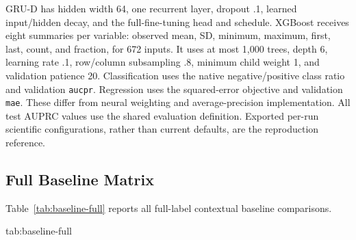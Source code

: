 GRU-D has hidden width 64, one recurrent layer, dropout .1, learned input/hidden decay, and the full-fine-tuning head and schedule. XGBoost receives eight summaries per variable: observed mean, SD, minimum, maximum, first, last, count, and fraction, for 672 inputs. It uses at most 1,000 trees, depth 6, learning rate .1, row/column subsampling .8, minimum child weight 1, and validation patience 20. Classification uses the native negative/positive class ratio and validation \texttt{aucpr}. Regression uses the squared-error objective and validation \texttt{mae}. These differ from neural weighting and average-precision implementation. All test AUPRC values use the shared evaluation definition. Exported per-run scientific configurations, rather than current defaults, are the reproduction reference.

\subsection{Full Baseline Matrix}

Table~\ref{tab:baseline-full} reports all full-label contextual baseline comparisons.

\begin{table}[htbp]
\floatconts
  {tab:baseline-full}
  {\caption{Full-data contextual baselines and the best SSL mean. Classification rows report AUPRC (higher is better). LOS rows report absolute error in days (lower is better). Bold marks the best unrounded mean per row. All entries average five seeds.}}
  {\scriptsize
  }
\end{table}
